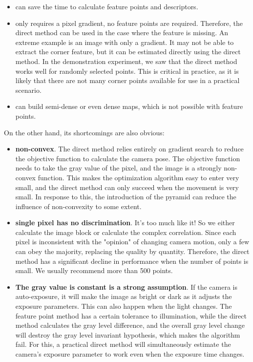 \begin{itemize}
\item can save the time to calculate feature points and descriptors.
\item only requires a pixel gradient, no feature points are required. Therefore, the direct method can be used in the case where the feature is missing. An extreme example is an image with only a gradient. It may not be able to extract the corner feature, but it can be estimated directly using the direct method. In the demonstration experiment, we saw that the direct method works well for randomly selected points. This is critical in practice, as it is likely that there are not many corner points available for use in a practical scenario.
\item can build semi-dense or even dense maps, which is not possible with feature points.
\end{itemize}

On the other hand, its shortcomings are also obvious:
\begin{itemize}
\item \textbf{non-convex}. The direct method relies entirely on gradient search to reduce the objective function to calculate the camera pose. The objective function needs to take the gray value of the pixel, and the image is a strongly non-convex function. This makes the optimization algorithm easy to enter very small, and the direct method can only succeed when the movement is very small. In response to this, the introduction of the pyramid can reduce the influence of non-convexity to some extent.
\item \textbf{single pixel has no discrimination}. It's too much like it! So we either calculate the image block or calculate the complex correlation. Since each pixel is inconsistent with the "opinion" of changing camera motion, only a few can obey the majority, replacing the quality by quantity. Therefore, the direct method has a significant decline in performance when the number of points is small. We usually recommend more than 500 points.
\item \textbf{The gray value is constant is a strong assumption}. If the camera is auto-exposure, it will make the image as bright or dark as it adjusts the exposure parameters. This can also happen when the light changes. The feature point method has a certain tolerance to illumination, while the direct method calculates the gray level difference, and the overall gray level change will destroy the gray level invariant hypothesis, which makes the algorithm fail. For this, a practical direct method will simultaneously estimate the camera's exposure parameter \cite{Engel2016} to work even when the exposure time changes.
\end{itemize}

